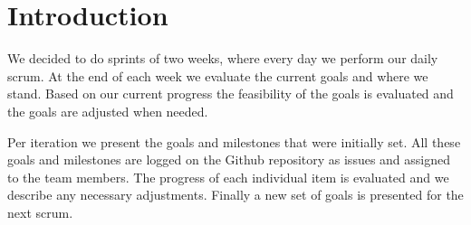 \section{Introduction}
We decided to do sprints of two weeks, where every day we perform our daily scrum. At the end of each week we evaluate the current goals and where we stand. Based on our current progress the feasibility of the goals is evaluated and the goals are adjusted when needed.

Per iteration we present the goals and milestones that were initially set. All these goals and milestones are logged on the Github repository as issues and assigned to the team members. The progress of each individual item is evaluated and we describe any necessary adjustments. Finally a new set of goals is presented for the next scrum.
